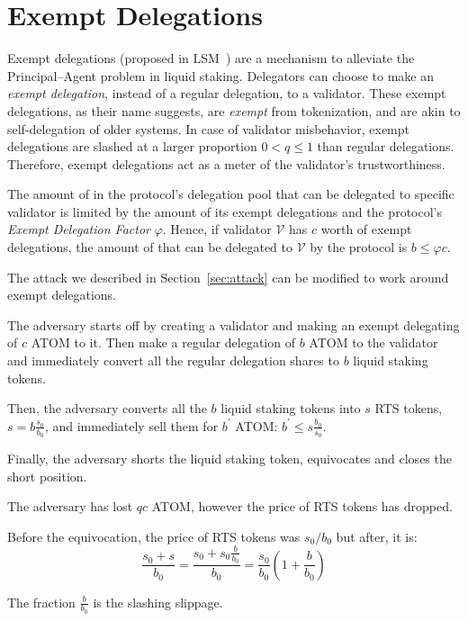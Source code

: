 \section{Exempt Delegations}

Exempt delegations (proposed in LSM~\cite{liquidity-staking-module})
are a mechanism to alleviate
the Principal--Agent problem in liquid staking.
Delegators can choose to make an \emph{exempt delegation},
instead of a regular delegation, to a validator.
These exempt delegations, as their name suggests,
are \emph{exempt} from tokenization,
and are akin to self-delegation of older systems.
In case of validator misbehavior, exempt delegations
are slashed at a larger proportion $0 < q \leq 1$ than regular delegations.
Therefore, exempt delegations act as a meter of the
validator's trustworthiness.


The amount of \asset in the protocol's delegation pool that can be
delegated to specific validator is limited by the amount of its
exempt delegations and the protocol's \emph{Exempt Delegation Factor} $\varphi$.
Hence, if validator $\mathcal{V}$ has $c$ \asset worth of exempt delegations,
the amount of \asset that can be delegated to $\mathcal{V}$ by the protocol
is $b \leq \varphi c$.

The attack we described in Section~\ref{sec:attack} can be modified to work
around exempt delegations.


The adversary starts off by creating a validator and making an
exempt delegating of $c$ ATOM to it.
Then make a regular delegation of $b$ ATOM to the validator and
immediately convert all the regular delegation shares to $b$ liquid
staking tokens.

Then, the adversary converts all the $b$ liquid staking tokens into
$s$ RTS tokens, $s = b \frac{s_0}{b_0}$, and immediately sell them for
$b^{'}$ ATOM: $b^{'} \leq s \frac{b_0}{s_0}$.

Finally, the adversary shorts the liquid staking token, equivocates
and closes the short position.

The adversary has lost $qc$ ATOM, however the price of RTS
tokens has dropped.

Before the equivocation, the price of RTS tokens was $s_0/b_0$ but
after, it is:
\[
\frac{s_0 + s}{b_0} =
\frac{s_0 + s_0\frac{b}{b_0}}{b_0} =
\frac{s_0}{b_0} (1 + \frac{b}{b_0})
\]

The fraction $\frac{b}{b_0}$ is the slashing slippage.

